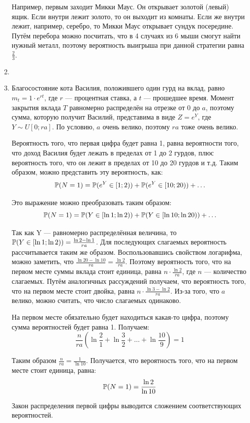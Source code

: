 \begin{enumerate}
Например, первым заходит Микки Маус. Он открывает золотой (левый) ящик.
Если внутри лежит золото, то он выходит из комнаты. Если же внутри лежит, например, серебро,
то Микки Маус открывает сундук посередине.
Путём перебора можно посчитать, что в 4 случаях из 6 мыши смогут найти нужный металл,
поэтому вероятность выигрыша при данной стратегии равна $\frac{2}{3}$.

\item

\item Благосостояние кота Василия, положившего один гурд на вклад,
равно $m_t = 1\cdot e^{rt}$, где $r$ — процентная ставка, а $t$ — прошедшее время.
Момент закрытия вклада $T$ равномерно распределён на отрезке от 0 до $a$,
поэтому сумма, которую получит Василий, представима в виде $Z = e^{Y}$, где $Y \sim U[0; ra]$.
По условию, $a$ очень велико, поэтому $ra$ тоже очень велико.

Вероятность того, что первая цифра будет равна 1, равна вероятности того,
что доход Василия будет лежать в пределах от 1 до 2 гурдов, плюс вероятность того,
что он лежит в пределах от 10 до 20 гурдов и т.д.
Таким образом, можно представить эту вероятность, как:
\[
\P(N=1) = \P(e^Y \in [1;2) ) + \P(e^Y \in [10; 20) ) + \ldots
\]

Это выражение можно преобразовать таким образом:
\[
\P(N=1) = \P(Y \in [\ln 1; \ln2) ) + \P(Y \in [\ln 10; \ln 20) ) + \ldots
\]

Так как Y — равномерно распределённая величина,
то $\P(Y \in [\ln 1; \ln2) ) = \frac{\ln 2 - \ln 1}{ra}$.
Для последующих слагаемых вероятность рассчитывается таким же образом.
Воспользовавшись свойством логарифма, можно заметить,
что $\frac{\ln 20 - \ln 10}{ra} = \frac{\ln 2}{ra}$.
Поэтому вероятность того, что на первом месте суммы вклада стоит единица,
равна $n\cdot \frac{\ln 2}{ra}$, где $n$ — количество слагаемых.
Путём аналогичных рассуждений получаем, что вероятность того,
что на первом месте стоит двойка, равна $n\cdot \frac{\ln 3- \ln 2}{ra}$.
Из-за того, что $a$ велико, можно считать, что число слагаемых одинаково.

На первом месте обязательно будет находиться какая-то цифра,
поэтому сумма вероятностей будет равна 1. Получаем:
\[
\dfrac{n}{ra}\left(\ln \frac{2}{1} + \ln \frac{3}{2} + \ldots + \ln \frac{10}{9}\right) = 1
\]

Таким образом $\frac{n}{ra} = \frac{1}{\ln 10}$.
Получается, что вероятность того, что на первом месте стоит единица, равна:
\[
\P (N=1) = \dfrac{\ln 2}{\ln 10}
\]

Закон распределения первой цифры выводится сложением соответствующих вероятностей.
\end{enumerate}


